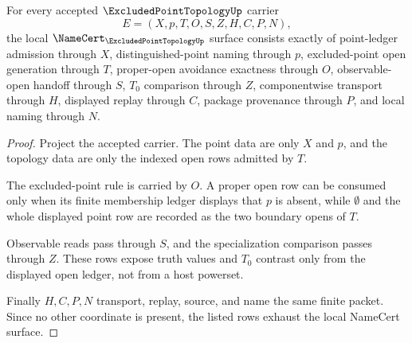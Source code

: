 \begin{theorem}
\label{thm:excluded-point-topology-namecert-obligations}
For every accepted $\ExcludedPointTopologyUp$ carrier
$$
E=(X,p,T,O,S,Z,H,C,P,N),
$$
the local $\NameCert_{\ExcludedPointTopologyUp}$ surface consists exactly of point-ledger admission through $X$, distinguished-point naming through $p$, excluded-point open generation through $T$, proper-open avoidance exactness through $O$, observable-open handoff through $S$, $T_0$ comparison through $Z$, componentwise transport through $H$, displayed replay through $C$, package provenance through $P$, and local naming through $N$.
\end{theorem}
\begin{proof}
Project the accepted carrier. The point data are only $X$ and $p$, and the topology data are only the indexed open rows admitted by $T$.

The excluded-point rule is carried by $O$. A proper open row can be consumed only when its finite membership ledger displays that $p$ is absent, while $\emptyset$ and the whole displayed point row are recorded as the two boundary opens of $T$.

Observable reads pass through $S$, and the specialization comparison passes through $Z$. These rows expose truth values and $T_0$ contrast only from the displayed open ledger, not from a host powerset.

Finally $H,C,P,N$ transport, replay, source, and name the same finite packet. Since no other coordinate is present, the listed rows exhaust the local NameCert surface.
\end{proof}

